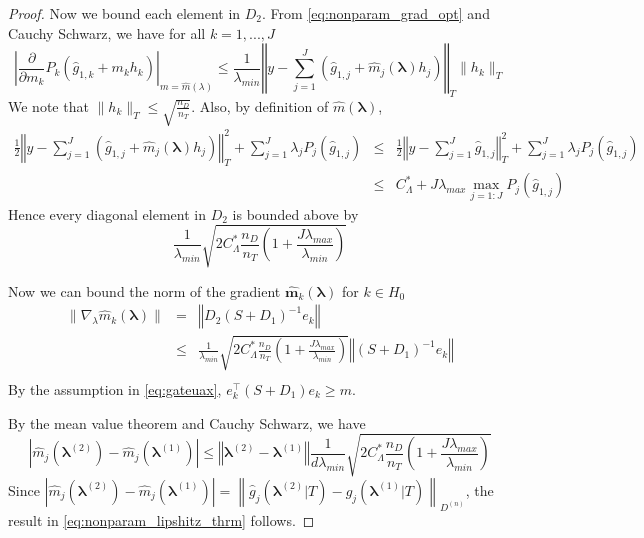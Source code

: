 \documentclass[12pt]{article}
\begin{document}
\begin{proof}
	Now we bound each element in $D_2$. From \eqref{eq:nonparam_grad_opt} and Cauchy Schwarz, we have for all $k=1,...,J$
	\begin{equation}
		\left|\frac{\partial}{\partial m_{k}}P_{k}(\hat{g}_{1,k}+m_{k}h_{k})\right|_{m=\hat{m}(\lambda)}
		\le 
		\frac{1}{\lambda_{min}}
		\left\Vert y-\sum_{j=1}^{J}\left(\hat{g}_{1,j}+\hat{m}_{j}(\boldsymbol{\lambda})h_{j}\right)
		\right\Vert _{T}\|h_{k}\|_{T}
	\end{equation}
	We note that $\|h_{k}\|_{T} \le \sqrt{\frac{n_{D}}{n_{T}}}$. Also, by definition of $\hat{m}(\boldsymbol{\lambda})$,
	\begin{eqnarray*}
	\frac{1}{2}\left\Vert y-\sum_{j=1}^{J}\left(\hat{g}_{1,j}+\hat{m}_{j}(\boldsymbol{\lambda})h_{j}\right)\right\Vert _{T}^{2}+\sum_{j=1}^{J}\lambda_{j}P_{j}(\hat{g}_{1,j})
	& \le & \frac{1}{2}\left\Vert y-\sum_{j=1}^{J}\hat{g}_{1,j}\right\Vert _{T}^{2}+\sum_{j=1}^{J}\lambda_{j}P_{j}(\hat{g}_{1,j})\\
	& \le & C_{\Lambda}^* + J\lambda_{max}\max_{j=1:J}P_{j}(\hat{g}_{1,j})
	\end{eqnarray*}
	Hence every diagonal element in $D_2$ is bounded above by
	\begin{equation}
	\frac{1}{\lambda_{min}}
	\sqrt{2C_{\Lambda}^* \frac{n_{D}}{n_{T}}\left(1+\frac{J\lambda_{max}}{\lambda_{min}}\right)}
	\end{equation}
	
	
	Now we can bound the norm of the gradient $\boldsymbol{\hat{m}}_k(\boldsymbol{\lambda})$ for $k \in H_0$
	\begin{eqnarray}
	\|\nabla_{\lambda}\hat{m}_{k}(\boldsymbol{\lambda})\|
	& = & \left\Vert D_{2}\left(S+D_{1}\right)^{-1}e_{k}\right\Vert \\
	& \le & \frac{1}{\lambda_{min}}
		\sqrt{2C_{\Lambda}^*
		\frac{n_{D}}{n_{T}}\left(1+\frac{J\lambda_{max}}{\lambda_{min}}\right)}\left\Vert \left(S+D_{1}\right)^{-1}e_{k}\right\Vert \\
	\end{eqnarray}
	By the assumption in \eqref{eq:gateuax}, $e_{k}^\top \left(S+D_{1}\right) e_{k} \ge m$.
	
	By the mean value theorem and Cauchy Schwarz, we have
	\begin{equation}
		\left|\hat{m}_{j}(\boldsymbol{\lambda}^{(2)})-\hat{m}_{j}(\boldsymbol{\lambda}^{(1)})\right| 
		\le \left\Vert \boldsymbol{\lambda}^{(2)}-\boldsymbol{\lambda}^{(1)}\right\Vert \frac{1}{d\lambda_{min}}\sqrt{2C^*_\Lambda \frac{n_{D}}{n_{T}}\left(1+\frac{J\lambda_{max}}{\lambda_{min}}\right)}
	\end{equation}
	Since $
	\left|
	\hat{m}_{j}(\boldsymbol{\lambda}^{(2)})-\hat{m}_{j}(\boldsymbol{\lambda}^{(1)})
	\right|  =
	\left \| 
	\hat{g}_{j}(\boldsymbol{\lambda}^{(2)}|T)-\hat{g}_{j}(\boldsymbol{\lambda}^{(1)}|T)
	\right  \|_{D^{(n)}}
	$, the result in \eqref{eq:nonparam_lipshitz_thrm} follows.
	
	
\end{proof}


\bigskip



\end{document}
